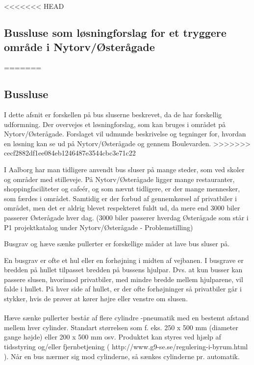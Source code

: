 <<<<<<< HEAD
\subsection{Bussluse som løsningforslag for et tryggere område i Nytorv/Østerågade}
\label{bussluselosningforslag}
=======
\subsection{Bussluse}
\label{bussluse}

I dette afsnit er forskellen på bus sluserne beskrevet, da de har forskellig udformning. Der overvejes et løsningforslag, som kan bruges i området på Nytorv/Østerågade. Forslaget vil udmunde beskrivelse og tegninger for, hvordan en løsning kan se ud på Nytorv/Østerågade og gennem Boulevarden.
>>>>>>> cecf2882df1ee084eb1246487e3544cbc3e71c22

I Aalborg har man tidligere anvendt bus sluser på mange steder, som ved skoler og områder med stilleveje. På Nytorv/Østerågade ligger mange restauranter, shoppingfaciliteter og cafeér, og som nævnt tidligere, er der mange mennesker, som færdes i området. Samtidig er der forbud af gennemkørsel af privatbiler i området, men det er aldrig blevet respekteret fuldt ud, da mere end 3000 biler passerer Østerågade hver dag. (3000 biler passerer hverdag Østerågade som står i P1 projektkatalog under Nytorv/Østerågade - Problemstilling)

Busgrav og hæve sænke pullerter er forskellige måder at lave bus sluser på.

En busgrav er ofte et hul eller en forhøjning i midten af vejbanen. I busgrave er bredden på hullet tilpasset bredden på bussens hjulpar. Dvs. at kun busser kan passere slusen, hvorimod privatbiler, med mindre bredde mellem hjulparene, vil falde i hullet. På hver side af hullet, er der ofte forhøjninger så privatbiler går i stykker, hvis de prøver at kører højre eller venstre om slusen. 
\\\\
Hæve sænke pullerter består af flere cylindre -pneumatik med en bestemt afstand mellem hver cylinder. Standart størrelsen som f. eks. 250 x 500 mm (diameter gange højde) eller 200 x 500 mm osv. Produktet kan styres ved hjælp af tidsstyring og/eller fjernbetjening ( http://www.g9-se.se/regulering-i-byrum.html ). Når en bus nærmer sig mod cylinderne, så sænkes cylinderne pr. automatik. 

